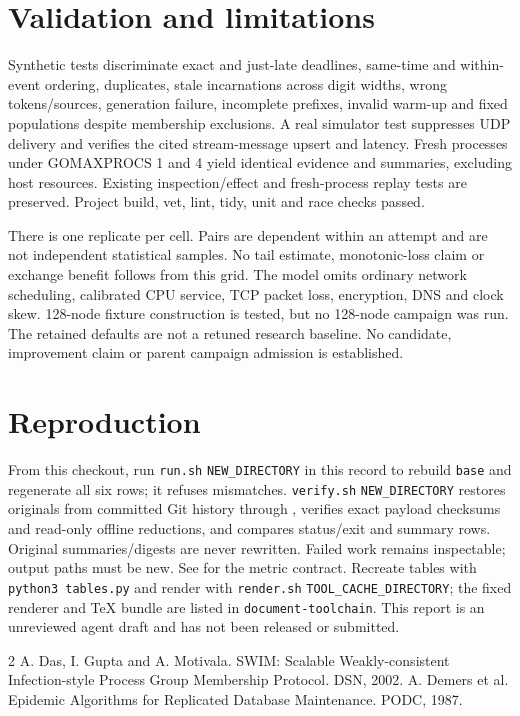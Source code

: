 \documentclass[10pt]{article}
\begin{document}
\section{Validation and limitations}
Synthetic tests discriminate exact and just-late deadlines, same-time and
within-event ordering, duplicates, stale incarnations across digit widths,
wrong tokens/sources, generation failure, incomplete prefixes, invalid warm-up
and fixed populations despite membership exclusions. A real simulator test
suppresses UDP delivery and verifies the cited stream-message upsert and
latency. Fresh processes under GOMAXPROCS 1 and 4 yield identical evidence
and summaries, excluding host resources. Existing inspection/effect and
fresh-process replay tests are preserved. Project build, vet, lint, tidy,
unit and race checks passed.

There is one replicate per cell. Pairs are dependent within an attempt and
are not independent statistical samples. No tail estimate, monotonic-loss
claim or exchange benefit follows from this grid. The model omits ordinary
network scheduling, calibrated CPU service, TCP packet loss, encryption,
DNS and clock skew. 128-node fixture construction is tested, but no 128-node
campaign was run. The retained defaults are not a retuned research baseline.
No candidate, improvement claim or parent campaign admission is established.

\section{Reproduction}
From this checkout, run \texttt{run.sh} \texttt{NEW\_DIRECTORY} in this record to
rebuild \texttt{base} and regenerate all six rows; it refuses mismatches.
\texttt{verify.sh} \texttt{NEW\_DIRECTORY} restores originals from committed Git
history through , verifies exact payload
checksums and read-only offline reductions, and compares status/exit and
summary rows. Original summaries/digests are never rewritten. Failed work
remains inspectable; output paths must be new. See 
for the metric contract. Recreate tables with \texttt{python3 tables.py} and
render with \texttt{render.sh} \texttt{TOOL\_CACHE\_DIRECTORY}; the fixed renderer and
TeX bundle are listed in \texttt{document-toolchain}. This report is an
unreviewed agent draft and has not been released or submitted.

\begin{thebibliography}{2}
 A. Das, I. Gupta and A. Motivala.
SWIM: Scalable Weakly-consistent Infection-style Process Group Membership
Protocol. DSN, 2002.
 A. Demers et al.
Epidemic Algorithms for Replicated Database Maintenance. PODC, 1987.
\end{thebibliography}
\end{document}
